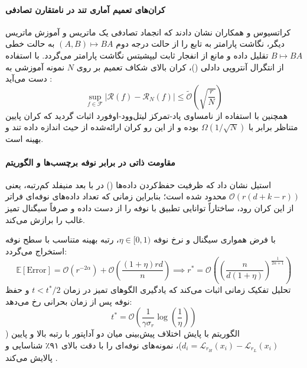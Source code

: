 \paragraph*{کران‌های تعمیم آماری تند در  نامتقارن تصادفی}
کراتسیوس و همکاران \cite{kratsios2025sharp} نشان دادند که انجماد تصادفی یک ماتریس و آموزش ماتریس دیگر، نگاشت پارامتر به تابع را از حالت درجه دوم $(A, B) \mapsto BA$ به حالت خطی $B \mapsto BA$ تقلیل داده و مانع از انفجار ثابت لیپشیتس نگاشت پارامتر می‌گردد. با استفاده از انتگرال آنتروپی دادلی ()، کران بالای شکاف تعمیم بر روی $N$ نمونه آموزشی به دست می‌آید \cite{kratsios2025sharp}:
\begin{equation}
    \sup_{f \in \mathcal{F}} |\mathcal{R}(f) - \mathcal{R}_N(f)| \le \tilde{\mathcal{O}}\left( \sqrt{\frac{r}{N}} \right)
\end{equation}
همچنین با استفاده از نامساوی پاد-تمرکز لیتل‌وود-اوفورد اثبات گردید که کران پایین متناظر برابر با $\Omega(1/\sqrt{N})$ بوده و از این رو کران ارائه‌شده از حیث اندازه داده تند و بهینه است.

\paragraph*{مقاومت ذاتی در برابر نوفه برچسب‌ها و الگوریتم }
استیل \cite{steele2026noise} نشان داد که ظرفیت حفظ‌کردن داده‌ها () در  با بعد منیفلد کم‌رتبه، یعنی $\mathcal{O}(r(d + k - r))$ محدود شده است؛ بنابراین زمانی که تعداد داده‌های نوفه‌ای فراتر از این کران رود،  ساختاراً توانایی تطبیق با نوفه را از دست داده و صرفاً سیگنال تمیز غالب را برازش می‌کند.

با فرض همواری سیگنال و نرخ نوفه $\eta \in [0, 1)$، رتبه بهینه متناسب با سطح نوفه استخراج می‌گردد:
\begin{equation}
    \mathbb{E}[\text{Error}] = \mathcal{O}(r^{-2\alpha}) + \mathcal{O}\left( \frac{(1+\eta)rd}{n} \right) \implies r^* = \mathcal{O}\left( \left( \frac{n}{d(1+\eta)} \right)^{\frac{1}{2\alpha + 1}} \right)
\end{equation}
تحلیل تفکیک زمانی اثبات می‌کند که یادگیری الگوهای تمیز در زمان $t < t^*/2$ و حفظ نوفه پس از زمان بحرانی رخ می‌دهد:
\begin{equation}
    t^* = \mathcal{O}\left( \frac{1}{\gamma \sigma_r} \log\left(\frac{1}{\eta}\right) \right)
\end{equation}
الگوریتم  با پایش اختلاف پیش‌بینی میان دو آداپتور با رتبه بالا و پایین ($d_i = \mathcal{L}_{r_H}(x_i) - \mathcal{L}_{r_L}(x_i)$)، نمونه‌های نوفه‌ای را با دقت بالای ۹۱٪ شناسایی و پالایش می‌کند \cite{steele2026noise}.

